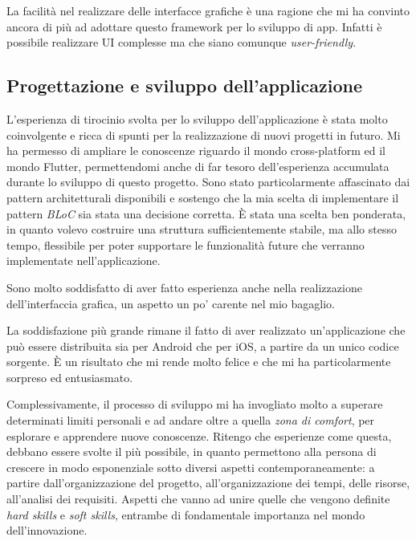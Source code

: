 La facilità nel realizzare delle interfacce grafiche è una ragione che mi ha convinto ancora di più ad adottare questo framework per lo sviluppo di app. Infatti è possibile realizzare UI complesse ma che siano comunque \textit{user-friendly}.

\subsection{Progettazione e sviluppo dell'applicazione}
L'esperienza di tirocinio svolta per lo sviluppo dell'applicazione è stata molto coinvolgente e ricca di spunti per la realizzazione di nuovi progetti in futuro. Mi ha permesso di ampliare le conoscenze riguardo il mondo cross-platform ed il mondo Flutter, permettendomi anche di far tesoro dell'esperienza accumulata durante lo sviluppo di questo progetto. Sono stato particolarmente affascinato dai pattern architetturali disponibili e sostengo che la mia scelta di implementare il pattern \textit{BLoC} sia stata una decisione corretta. È stata una scelta ben ponderata, in quanto volevo costruire una struttura sufficientemente stabile, ma allo stesso tempo, flessibile per poter supportare le funzionalità future che verranno implementate nell'applicazione.

Sono molto soddisfatto di aver fatto esperienza anche nella realizzazione dell'interfaccia grafica, un aspetto un po' carente nel mio bagaglio.

La soddisfazione più grande rimane il fatto di aver realizzato un'applicazione che può essere distribuita sia per Android che per iOS, a partire da un unico codice sorgente. È un risultato che mi rende molto felice e che mi ha particolarmente sorpreso ed entusiasmato. 

Complessivamente, il processo di sviluppo mi ha invogliato molto a superare determinati limiti personali e ad andare oltre a quella \textit{zona di comfort}, per esplorare e apprendere nuove conoscenze. Ritengo che esperienze come questa, debbano essere svolte il più possibile, in quanto permettono alla persona di crescere in modo esponenziale sotto diversi aspetti contemporaneamente: a partire dall'organizzazione del progetto, all'organizzazione dei tempi, delle risorse, all'analisi dei requisiti. Aspetti che vanno ad unire quelle che vengono definite \textit{hard skills} e \textit{soft skills}, entrambe di fondamentale importanza nel mondo dell'innovazione.